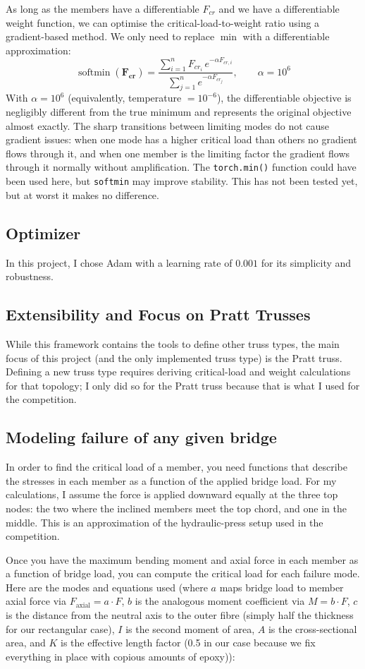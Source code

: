 \documentclass[11pt]{article}
\begin{document}
As long as the members have a differentiable $F_{cr}$ and we have a differentiable weight
function, we can optimise the critical-load-to-weight ratio using a gradient-based method.
We only need to replace $\min$ with a differentiable approximation:
\[
  \operatorname{softmin}(\mathbf{F_{cr}})
  = \frac{\displaystyle\sum_{i=1}^{n} F_{cr_i}\, e^{-\alpha F_{cr,i}}}
         {\displaystyle\sum_{j=1}^{n} e^{-\alpha F_{cr_j}}},
  \qquad \alpha = 10^6
\]
With $\alpha = 10^6$ (equivalently, temperature $= 10^{-6}$), the differentiable objective
is negligibly different from the true minimum and represents the original objective almost
exactly. The sharp transitions between limiting modes do not cause gradient issues: when
one mode has a higher critical load than others no gradient flows through it, and when one
member is the limiting factor the gradient flows through it normally without amplification. 
The \texttt{torch.min()} function could have been used here, but \texttt{softmin} may improve stability.
This has not been tested yet, but at worst it makes no difference.
\subsection{Optimizer}
In this project, I chose Adam with a learning rate of $0.001$ for its simplicity and
robustness.
\subsection{Extensibility and Focus on Pratt Trusses}
While this framework contains the tools to define other truss types, the main focus of
this project (and the only implemented truss type) is the Pratt truss. Defining a new
truss type requires deriving critical-load and weight calculations for that topology; I
only did so for the Pratt truss because that is what I used for the competition.
\subsection{Modeling failure of any given bridge}
In order to find the critical load of a member, you need functions that describe the
stresses in each member as a function of the applied bridge load. For my calculations, I
assume the force is applied downward equally at the three top nodes: the two where the
inclined members meet the top chord, and one in the middle. This is an approximation of
the hydraulic-press setup used in the competition.

Once you have the maximum bending moment and axial force in each member as a function of
bridge load, you can compute the critical load for each failure mode. Here are the modes
and equations used (where $a$ maps bridge load to member axial force via $F_\text{axial}
= a \cdot F$, $b$ is the analogous moment coefficient via $M = b \cdot F$, $c$ is the
distance from the neutral axis to the outer fibre (simply half the thickness for our rectangular case), $I$ is the second moment of area, $A$
is the cross-sectional area, and $K$ is the effective length factor (0.5 in our case because we fix everything in place with copious amounts of epoxy)):
\end{document}
